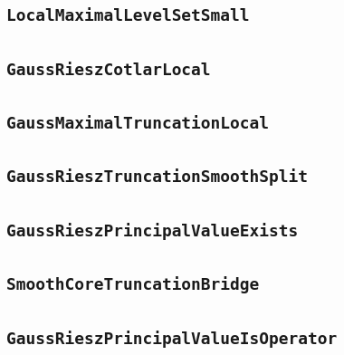 \documentclass[11pt]{amsart}
\theoremstyle{definition}
\begin{document}
\subsection{\texorpdfstring{\texttt{LocalMaximalLevelSetSmall}}{LocalMaximalLevelSetSmall}}\label{node:LocalMaximalLevelSetSmall}


\subsection{\texorpdfstring{\texttt{GaussRieszCotlarLocal}}{GaussRieszCotlarLocal}}\label{node:GaussRieszCotlarLocal}


\subsection{\texorpdfstring{\texttt{GaussMaximalTruncationLocal}}{GaussMaximalTruncationLocal}}\label{node:GaussMaximalTruncationLocal}


\subsection{\texorpdfstring{\texttt{GaussRieszTruncationSmoothSplit}}{GaussRieszTruncationSmoothSplit}}\label{node:GaussRieszTruncationSmoothSplit}


\subsection{\texorpdfstring{\texttt{GaussRieszPrincipalValueExists}}{GaussRieszPrincipalValueExists}}\label{node:GaussRieszPrincipalValueExists}


\subsection{\texorpdfstring{\texttt{SmoothCoreTruncationBridge}}{SmoothCoreTruncationBridge}}\label{node:SmoothCoreTruncationBridge}


\subsection{\texorpdfstring{\texttt{GaussRieszPrincipalValueIsOperator}}{GaussRieszPrincipalValueIsOperator}}\label{node:GaussRieszPrincipalValueIsOperator}

\end{document}
